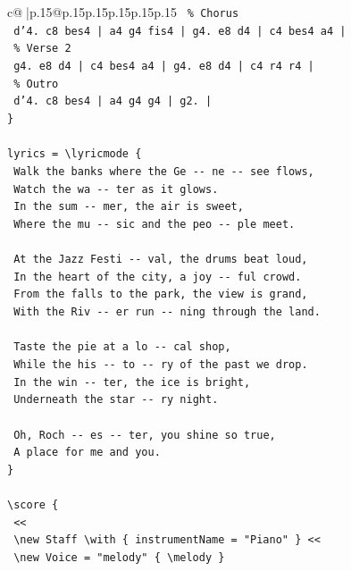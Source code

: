 \documentclass{article}
\begin{document}
{\begin{supertabular}{c@{$\;$}|p{.15\linewidth}@{}p{.15\linewidth}p{.15\linewidth}p{.15\linewidth}p{.15\linewidth}p{.15\linewidth}}
{{{\texttt{  \% Chorus} \\
\texttt{  d'4. c8 bes4 | a4 g4 fis4 | g4. e8 d4 | c4 bes4 a4 |} \\
\texttt{  \% Verse 2} \\
\texttt{  g4. e8 d4 | c4 bes4 a4 | g4. e8 d4 | c4 r4 r4 |} \\
\texttt{  \% Outro} \\
\texttt{  d'4. c8 bes4 | a4 g4 g4 | g2. |} \\
\texttt{\}} \\
\\ 
\texttt{lyrics = \textbackslash{}lyricmode \{} \\
\texttt{  Walk the banks where the Ge {-}{-} ne {-}{-} see flows,} \\
\texttt{  Watch the wa {-}{-} ter as it glows.} \\
\texttt{  In the sum {-}{-} mer, the air is sweet,} \\
\texttt{  Where the mu {-}{-} sic and the peo {-}{-} ple meet.} \\
\\ 
\texttt{  At the Jazz Festi {-}{-} val, the drums beat loud,} \\
\texttt{  In the heart of the city, a joy {-}{-} ful crowd.} \\
\texttt{  From the falls to the park, the view is grand,} \\
\texttt{  With the Riv {-}{-} er run {-}{-} ning through the land.} \\
\\ 
\texttt{  Taste the pie at a lo {-}{-} cal shop,} \\
\texttt{  While the his {-}{-} to {-}{-} ry of the past we drop.} \\
\texttt{  In the win {-}{-} ter, the ice is bright,} \\
\texttt{  Underneath the star {-}{-} ry night.} \\
\\ 
\texttt{  Oh, Roch {-}{-} es {-}{-} ter, you shine so true,} \\
\texttt{  A place for me and you.} \\
\texttt{\}} \\
\\ 
\texttt{\textbackslash{}score \{} \\
\texttt{  <<} \\
\texttt{    \textbackslash{}new Staff \textbackslash{}with \{ instrumentName = "Piano" \} <<} \\
\texttt{      \textbackslash{}new Voice = "melody" \{ \textbackslash{}melody \}} \\
}}}
\end{supertabular}}
\end{document}

